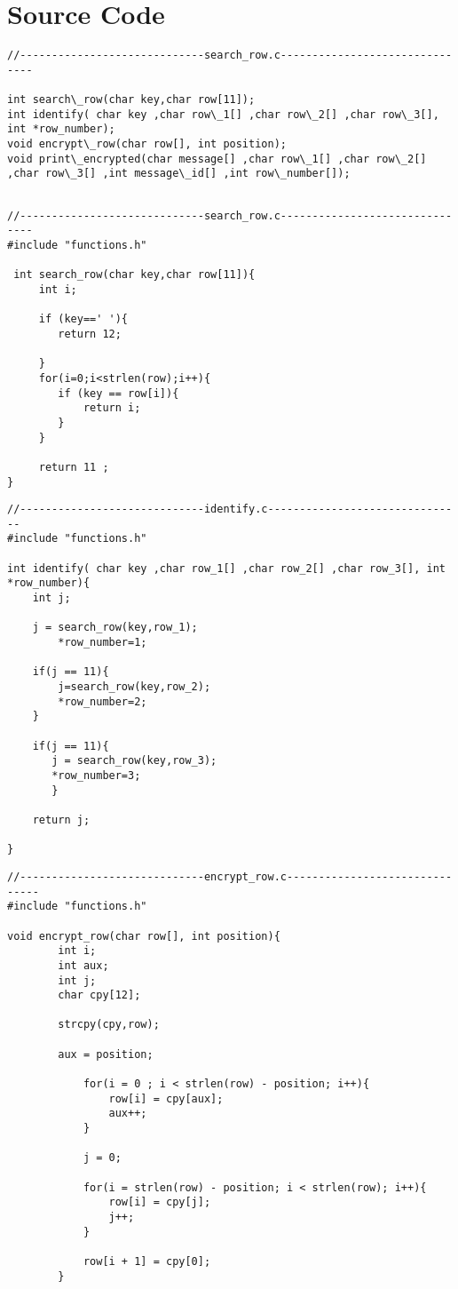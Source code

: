 \documentclass[14pt]{article}
\begin{document}
\section*{Source Code}
\begin{lstlisting}
//-----------------------------search_row.c-------------------------------

int search\_row(char key,char row[11]);
int identify( char key ,char row\_1[] ,char row\_2[] ,char row\_3[], int *row_number);
void encrypt\_row(char row[], int position);
void print\_encrypted(char message[] ,char row\_1[] ,char row\_2[] ,char row\_3[] ,int message\_id[] ,int row\_number[]);


\end{lstlisting}
\begin{lstlisting}
//-----------------------------search_row.c-------------------------------
#include "functions.h"

 int search_row(char key,char row[11]){
     int i;

     if (key==' '){
        return 12;

     }
     for(i=0;i<strlen(row);i++){
        if (key == row[i]){
            return i;
        }
     }

     return 11 ;
}
\end{lstlisting}
\begin{lstlisting}
//-----------------------------identify.c-------------------------------
#include "functions.h"

int identify( char key ,char row_1[] ,char row_2[] ,char row_3[], int *row_number){
    int j;

    j = search_row(key,row_1);
        *row_number=1;

    if(j == 11){
        j=search_row(key,row_2);
        *row_number=2;
    }

    if(j == 11){
       j = search_row(key,row_3);
       *row_number=3;
       }

    return j;

}
\end{lstlisting}
\begin{lstlisting}
//-----------------------------encrypt_row.c-------------------------------
#include "functions.h"

void encrypt_row(char row[], int position){
        int i;
        int aux;
        int j;
        char cpy[12];

        strcpy(cpy,row);

        aux = position;

            for(i = 0 ; i < strlen(row) - position; i++){
                row[i] = cpy[aux];
                aux++;
            }

            j = 0;

            for(i = strlen(row) - position; i < strlen(row); i++){
                row[i] = cpy[j];
                j++;
            }

            row[i + 1] = cpy[0];
        }
 
\end{lstlisting}
\end{document}

